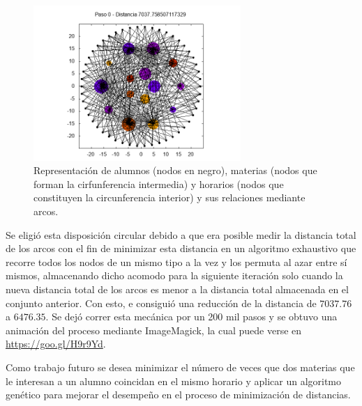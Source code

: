 \documentclass{article}
\begin{document}
  \begin{figure}[h]
    \includegraphics[width=0.7\textwidth]{h000000}
    \centering
    \caption{Representación de alumnos (nodos en negro), materias (nodos que forman la cirfunferencia intermedia) y horarios (nodos que constituyen la circunferencia interior) y sus relaciones mediante arcos.}
    \label{fig:horarios}
  \end{figure}

  Se eligió esta disposición circular debido a que era posible medir la distancia total de los arcos con el fin de minimizar esta distancia en un algoritmo exhaustivo que recorre todos los nodos de un mismo tipo a la vez y los permuta al azar entre sí mismos, almacenando dicho acomodo para la siguiente iteración solo cuando la nueva distancia total de los arcos es menor a la distancia total almacenada en el conjunto anterior. Con esto, e consiguió una reducción de la distancia de $7037.76$ a $6476.35$. Se dejó correr esta mecánica por un 200 mil pasos y se obtuvo una animación del proceso mediante ImageMagick, la cual puede verse en \url{https://goo.gl/H9r9Yd}.

  Como trabajo futuro se desea minimizar el número de veces que dos materias que le interesan a un alumno coincidan en el mismo horario y aplicar un algoritmo genético para mejorar el desempeño en el proceso de minimización de distancias.

  {}
  
\end{document}
